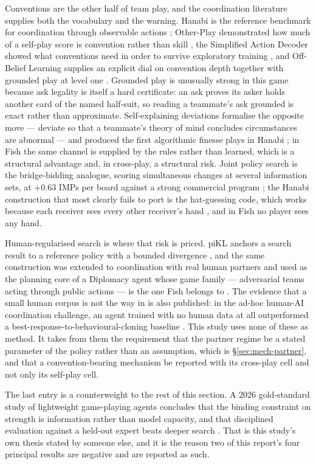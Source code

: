 Conventions are the other half of team play, and the coordination literature
supplies both the vocabulary and the warning. Hanabi is the reference benchmark
for coordination through observable actions \cite{bard-hanabi}; Other-Play
demonstrated how much of a self-play score is convention rather than skill
\cite{hu-otherplay}, the Simplified Action Decoder showed what conventions need
in order to survive exploratory training \cite{hu-sad}, and Off-Belief Learning
supplies an explicit dial on convention depth together with grounded play at
level one \cite{hu2021obl}. Grounded play is unusually strong in this game
because ask legality is itself a hard certificate: an ask proves its asker holds
another card of the named half-suit, so reading a teammate's ask grounded is
exact rather than approximate. Self-explaining deviations formalise the opposite
move --- deviate so that a teammate's theory of mind concludes circumstances are
abnormal --- and produced the first algorithmic finesse plays in Hanabi
\cite{hu2022sed}; in Fish the same channel is supplied by the rules rather than
learned, which is a structural advantage and, in cross-play, a structural risk.
Joint policy search is the bridge-bidding analogue, scoring simultaneous changes
at several information sets, at $+0.63$ IMPs per board against a strong
commercial program \cite{tian2020jps}; the Hanabi construction that most clearly
fails to port is the hat-guessing code, which works because each receiver sees
every other receiver's hand \cite{cox-hanabi}, and in Fish no player sees any
hand.

Human-regularised search is where that risk is priced. piKL anchors a search
result to a reference policy with a bounded divergence \cite{jacob2022pikl}, and
the same construction was extended to coordination with real human partners
\cite{hu2022humanregularized} and used as the planning core of a Diplomacy agent
whose game family --- adversarial teams acting through public actions --- is the
one Fish belongs to \cite{fair2022cicero}. The evidence that a small human
corpus is not the way in is also published: in the ad-hoc human-AI coordination
challenge, an agent trained with no human data at all outperformed a
best-response-to-behavioural-cloning baseline \cite{dizdarevic2025ah2ac2}. This
study uses none of these as method. It takes from them the requirement that the
partner regime be a stated parameter of the policy rather than an assumption,
which is \S\ref{sec:mech-partner}, and that a convention-bearing mechanism be
reported with its cross-play cell and not only its self-play cell.

The last entry is a counterweight to the rest of this section. A 2026
gold-standard study of lightweight game-playing agents concludes that the
binding constraint on strength is information rather than model capacity, and
that disciplined evaluation against a held-out expert beats deeper search
\cite{kelidari2026goldstandard}. That is this study's own thesis stated by
someone else, and it is the reason two of this report's four principal results
are negative and are reported as such.

